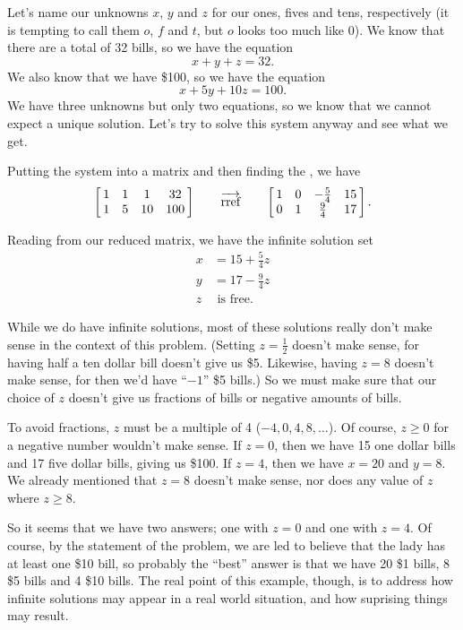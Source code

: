 {Let's name our unknowns $x$, $y$ and $z$ for our ones, fives and tens, respectively (it is tempting to call them $o$, $f$ and $t$, but $o$ looks too much like 0). We know that there are a total of 32 bills, so we have the equation $$x+y+z = 32.$$ We also know that we have \$100, so we have the equation $$x+5y+10z = 100.$$ We have three unknowns but only two equations, so we know that we cannot expect a unique solution. Let's try to solve this system anyway and see what we get.

Putting the system into a matrix and then finding the \rref, we have 
$$\bmx{cccc}1&1&1&32\\ 1&5&10&100\\ \emx \qquad \overrightarrow{\text{rref}}\qquad \bmx{cccc}1&0&-\frac54&15\\0&1&\frac94&17\\ \emx.$$

Reading from our reduced matrix, we have the infinite solution set \begin{align*}x &=15+\frac54z\\ y&=17 - \frac94z\\ z & \text{ is free.}\end{align*}

While we do have infinite solutions, most of these solutions really don't make sense in the context of this problem. (Setting $z = \frac12$ doesn't make sense, for having half a ten dollar bill doesn't give us \$5. Likewise, having $z = 8$ doesn't make sense, for then we'd have ``$-1$'' \$5 bills.) So we must make sure that our choice of $z$ doesn't give us fractions of bills or negative amounts of bills. 

To avoid fractions, $z$ must be a multiple of 4 ($-4, 0, 4, 8, \ldots$). Of course, $z\geq 0$ for a negative number wouldn't make sense. If $z = 0$, then we have 15 one dollar bills and 17 five dollar bills, giving us \$100. If $z = 4$, then we have $x = 20$ and $y = 8$. We already mentioned that $z=8$ doesn't make sense, nor does any value of $z$ where $z\geq 8$. 

So it seems that we have two answers; one with $z=0$ and one with $z=4$. Of course, by the statement of the problem, we are led to believe that the lady has at least one \$10 bill, so probably the ``best'' answer is that we have 20 \$1 bills, 8 \$5 bills and 4 \$10 bills. The real point of this example, though, is to address how infinite solutions may appear in a real world situation, and how suprising things may result.}\\ %

